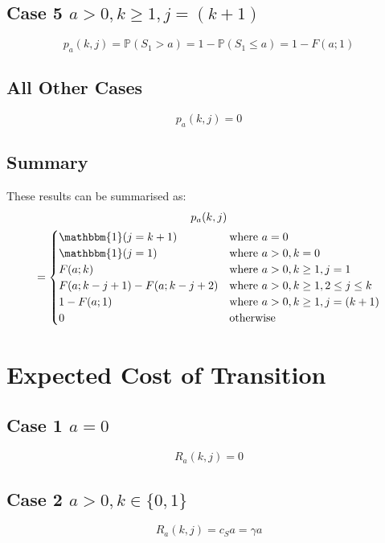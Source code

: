 \subsection{Case 5 $a > 0, k \geq 1, j = (k + 1)$}
\begin{equation*}
	p_{a} (k, j) = \mathbb{P} (S_{1} > a) = 1 - \mathbb{P} (S_{1} \leq a) = 1 - F (a; 1)
\end{equation*}

\subsection{All Other Cases}
\begin{equation*}
	p_{a} (k, j) = 0
\end{equation*}

\subsection{Summary}
These results can be summarised as:
\begin{multline}
	p_{a} (k, j) \\
	= \begin{cases}
		\mathbbm{1} (j = k + 1) & \text{where $a = 0$} \\
		\mathbbm{1} (j = 1) & \text{where $a > 0, k = 0$} \\
		F (a; k) & \text{where $a > 0, k \geq 1, j = 1$} \\
		F (a; k - j + 1) - F (a; k - j + 2) & \text{where $a > 0, k \geq 1, 2 \leq j \leq k$} \\
		1 - F (a; 1) & \text{where $a > 0, k \geq 1, j = (k + 1)$} \\
		0 & \text{otherwise}
	\end{cases}
\end{multline}

\section{Expected Cost of Transition}
\subsection{Case 1 $a = 0$}
\begin{equation*}
	R_{a} (k, j) = 0
\end{equation*}

\subsection{Case 2 $a > 0, k \in \{ 0, 1 \}$}
\begin{equation*}
	R_{a} (k, j) = c_{S} a = \gamma a
\end{equation*}

